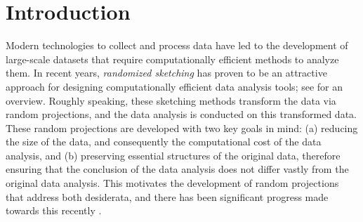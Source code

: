 \documentclass[11pt]{article}
\theoremstyle{definition}
\theoremstyle{plain}
\begin{document}

\begingroup
  \renewcommand\thefootnote{}%
    \renewcommand\thefootnote{$\ddagger$}%
\endgroup


\section{Introduction}
\label{s:intro}

Modern technologies to collect and process data have led to the development of large-scale datasets that require computationally efficient methods to analyze them. In recent years, \emph{randomized sketching} has proven to be an attractive approach for designing computationally efficient data analysis tools; see \citet{woodruff2014sketching} for an overview.
Roughly speaking, these sketching methods transform the data via random projections, and the data analysis is conducted on this transformed data.
These random projections are developed with two key goals in mind: (a) reducing the size of the data, and consequently the computational cost of the data analysis, and (b) preserving essential structures of the original data, therefore ensuring that the conclusion of the data analysis does not differ vastly from the original data analysis.
This motivates the development of random projections that address both desiderata, and there has been significant progress made towards this recently \citep{drineas2006sampling, sarlos2006improved, ailon2009fast, ailon2013almost, drineas2011faster, pilanci2015randomized, pilanci_hessiansketch, pilanci2017newton, cohen2016optimal_amm, avron2017sharper, derezinski2021newton}. 
\end{document}

